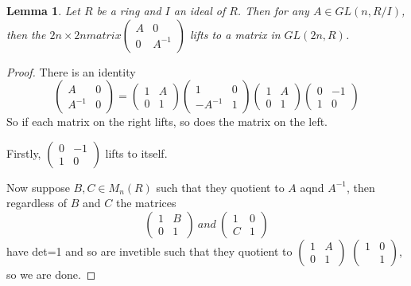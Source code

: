 \documentclass[a4paper,10pt]{article}
\newtheorem{lem}[thm]{Lemma}
\begin{document}
\begin{lem}
Let $R$ be a ring and $I$ an ideal of $R$. Then for any $A\in GL(n,R/I)$, then the $2n\times2n matrix \left(\begin{array}{cc} A & 0 \\ 0 & A^{-1} \end{array}\right)$ lifts to a matrix in $GL(2n,R)$.
\end{lem}
\begin{proof}
There is an identity $$\left(\begin{array}{cc} A & 0 \\ A^{-1} & 0 \end{array}\right)=
\left(\begin{array}{cc} 1 & A \\ 0 & 1 \end{array}\right)
\left(\begin{array}{cc} 1 & 0 \\ -A^{-1} & 1 \end{array}\right)
\left(\begin{array}{cc} 1 & A \\ 0 & 1 \end{array}\right)
\left(\begin{array}{cc} 0 & -1 \\ 1 & 0 \end{array}\right)$$
So if each matrix on the right lifts, so does the matrix on the left.

Firstly, $\left(\begin{array}{cc} 0 & -1 \\ 1 & 0 \end{array}\right)$ lifts to itself.

Now suppose $B,C\in M_{n}(R)$ such that they quotient to $A$ aqnd $A^{-1}$, then regardless of $B$ and $C$ the matrices $$\left(\begin{array}{cc} 1 & B \\ 0 & 1 \end{array}\right)\ and\ \left(\begin{array}{cc} 1 & 0 \\ C & 1 \end{array}\right)$$ have det=1 and so are invetible such that they quotient to $\left(\begin{array}{cc} 1 & A \\ 0 & 1 \end{array}\right)$ $\left(\begin{array}{cc} 1 & 0 \\  & 1 \end{array}\right)$, so we are done.
\end{proof}
\end{document}

